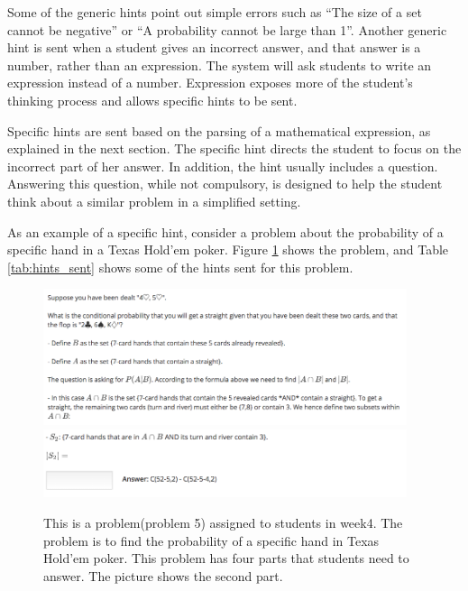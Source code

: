 \documentclass{llncs2e/llncs}
\begin{document}
Some of the generic hints point out simple errors such as ``The size of a set cannot be negative'' or ``A probability cannot be large than 1''. Another generic hint is sent when a student gives an incorrect answer, and that answer is a number, rather than an expression. The system will ask students to write an expression instead of a number. Expression exposes more of the student's thinking process and allows specific hints to be sent.

Specific hints are sent based on the parsing of a mathematical
expression, as explained in the next section. The specific hint
directs the student to focus on the incorrect part of her answer.  In
addition, the hint usually includes a question. Answering this
question, while not compulsory, is designed to help the student
think about a similar problem in a simplified setting.

As an example of a specific hint, consider a problem about the
probability of a specific hand in a Texas Hold'em poker. Figure
\ref{fig:hint_prob} shows the problem, and Table \ref{tab:hints_sent}
shows some of the hints sent for this problem.

\begin{figure}[ht]
  \centering
	\includegraphics[width=0.95\textwidth]{image/problem_screenshot.png} \\
	\includegraphics[width=0.95\textwidth]{image/part_screenshot.png}
   \caption{This is a problem(problem 5) assigned to students in
     week4. The problem is to find the probability of a specific hand
     in Texas Hold'em poker. This problem has four parts that students
     need to answer. The picture shows the second part.}
   \label{fig:hint_prob}
\end{figure}
\end{document}
